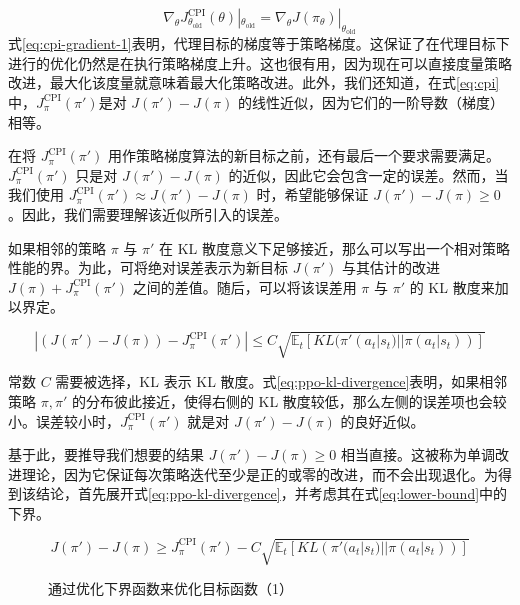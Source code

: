 \documentclass[lang=cn,newtx,10pt,scheme=chinese]{elegantbook}
\begin{document}
{\begin{equation}\label{eq:cpi-gradient-1}
\nabla_\theta J^{\text{CPI}}_{\theta_\text{old}}(\theta)|_{\theta_{\text{old}}} = \nabla_\theta J(\pi_\theta)|_{\theta_{\text{old}}}
\end{equation}
式\ref{eq:cpi-gradient-1}表明，代理目标的梯度等于策略梯度。这保证了在代理目标下进行的优化仍然是在执行策略梯度上升。这也很有用，因为现在可以直接度量策略改进，最大化该度量就意味着最大化策略改进。此外，我们还知道，在式\ref{eq:cpi}中，$J^\text{CPI}_\pi(\pi')$是对 $J(\pi')-J(\pi)$ 的线性近似，因为它们的一阶导数（梯度）相等。
}

在将 $J_\pi^\text{CPI}(\pi')$ 用作策略梯度算法的新目标之前，还有最后一个要求需要满足。$J_\pi^\text{CPI}(\pi')$ 只是对 $J(\pi')-J(\pi)$ 的近似，因此它会包含一定的误差。然而，当我们使用 $J_\pi^\text{CPI}(\pi')\approx J(\pi')-J(\pi)$ 时，希望能够保证 $J(\pi')-J(\pi)\geq 0$。因此，我们需要理解该近似所引入的误差。

如果相邻的策略 $\pi$ 与 $\pi'$ 在 KL 散度意义下足够接近，那么可以写出一个相对策略性能的界。为此，可将绝对误差表示为新目标 $J(\pi')$ 与其估计的改进 $J(\pi)+J_\pi^\text{CPI}(\pi')$ 之间的差值。随后，可以将该误差用 $\pi$ 与 $\pi'$ 的 KL 散度来加以界定。

\begin{equation}\label{eq:ppo-kl-divergence}
|\left( J(\pi')-J(\pi) \right)-J_\pi^\text{CPI}(\pi')|\leq{C\sqrt{\mathbb{E}_t[KL(\pi'(a_t|s_t)||\pi(a_t|s_t))]}}
\end{equation}

常数 $C$ 需要被选择，KL 表示 KL 散度。式\ref{eq:ppo-kl-divergence}表明，如果相邻策略 $\pi,\pi'$ 的分布彼此接近，使得右侧的 KL 散度较低，那么左侧的误差项也会较小。误差较小时，$J_\pi^\text{CPI}(\pi')$ 就是对 $J(\pi')-J(\pi)$ 的良好近似。

基于此，要推导我们想要的结果 $J(\pi')-J(\pi)\geq 0$ 相当直接。这被称为单调改进理论，因为它保证每次策略迭代至少是正的或零的改进，而不会出现退化。为得到该结论，首先展开式\ref{eq:ppo-kl-divergence}，并考虑其在式\ref{eq:lower-bound}中的下界。

\begin{equation}\label{eq:lower-bound}
J(\pi')-J(\pi)\geq J_\pi^\text{CPI}(\pi') - C\sqrt{\mathbb{E}_t[KL\left(\pi'(a_t|s_t)||\pi(a_t|s_t)\right)]}
\end{equation}

\begin{figure}[!ht]
\caption{通过优化下界函数来优化目标函数（1）}
\label{fig:lowerbound1}
\end{figure}
\end{document}
